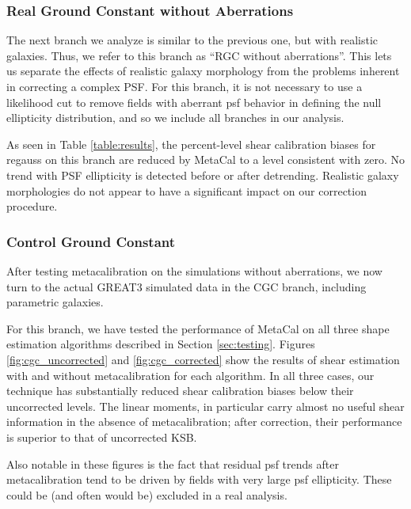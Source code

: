 \documentclass[iop]{emulateapj}
\begin{document}
\subsubsection{Real Ground Constant without Aberrations}

The next branch we analyze is similar to the previous one, but with
realistic galaxies.  Thus, we refer to this branch as ``RGC without
aberrations''. This lets us separate the effects of realistic galaxy
morphology from the problems inherent in correcting a complex PSF. For
this branch, it is not necessary to use a likelihood cut to remove
fields with aberrant psf behavior in defining the null ellipticity
distribution, and so we include all branches in our analysis.

As seen in Table \ref{table:results}, the percent-level shear
calibration biases for regauss on this branch are reduced by MetaCal
to a level consistent with zero. No trend with PSF ellipticity is
detected before or after detrending. Realistic galaxy morphologies do
not appear to have a significant impact on our correction procedure.


\subsubsection{Control Ground Constant}

After testing metacalibration on the simulations without aberrations,
we now turn to the actual GREAT3 simulated data in the CGC branch,
including parametric galaxies.

For this branch, we have tested the performance of MetaCal on all
three shape estimation algorithms described in Section
\ref{sec:testing}. Figures \ref{fig:cgc_uncorrected} and \ref{fig:cgc_corrected}
show the results of shear estimation with
and without metacalibration for each algorithm. In all three cases,
our technique has substantially reduced shear calibration biases below
their uncorrected levels. The linear moments, in particular carry
almost no useful shear information in the absence of metacalibration;
after correction, their performance is superior to that of uncorrected
KSB.

Also notable in these figures is the fact that residual psf trends
after metacalibration tend to be driven by fields with very large psf
ellipticity. These could be (and often would be) excluded in a real
analysis. 
\end{document}
